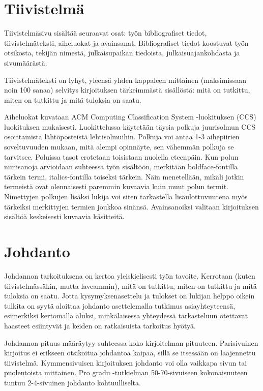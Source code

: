 \section{Tiivistelmä}



Tiivistelmäsivu sisältää seuraavat osat: työn bibliografiset tiedot,
tiivistelmäteksti, aiheluokat ja avainsanat. Bibliografiset tiedot
koostuvat työn otsikosta, tekijän nimestä, julkaisupaikan tiedoista,
julkaisuajankohdasta ja sivumäärästä.

Tiivistelmäteksti on lyhyt, yleensä yhden kappaleen mittainen
(maksimissaan noin 100 sanaa) selvitys
kirjoituksen tärkeimmästä sisällöstä: mitä on tutkittu, miten on
tutkittu ja mitä tuloksia on saatu.


Aiheluokat kuvataan ACM Computing Classification System -luokituksen (CCS)
luokituksen mukaisesti. Luokittelussa käytetään täysia polkuja juurisolmun CCS osoittamista lähtöposteistä lehtisolmuihin. Polkuja voi antaa 1-3 aihepiirien soveltuvuuden mukaan, mitä alempi opinnäyte, sen vähemmän polkuja se tarvitsee. 
Poluissa tasot erotetaan toisistaan nuolella eteenpäin. Kun  polun nimisanoja arvioidaan suhteessa työn sisältöön, merkitään boldface-fontilla tärkein termi, italics-fontilla toiseksi tärkein. Näin menetellään, mikäli jotkin termeistä ovat olennaisesti paremmin kuvaavia kuin muut polun termit. Nimettyjen polkujen lisäksi lukija voi siten tarkastella lisäulottuvuutena myös tärkeiksi merkittyjen termien joukkoa sinänsä.
Avainsanoiksi valitaan kirjoituksen sisältöä
keskeisesti kuvaavia käsitteitä.

\section{Johdanto}


Johdannon tarkoituksena on kertoa yleiskielisesti
työn tavoite. Kerrotaan (kuten tiivistelmässäkin, mutta laveammin),
mitä on tutkittu, miten on tutkittu ja mitä tuloksia on saatu.
Jotta kysymyksenasettelu ja tulokset on lukijan helppo oikein tulkita on syytä aloittaa johdanto asettelemalla tutkimus asiayhteyteensä, esimerkiksi kertomalla aluksi, minkälaisessa yhteydessä tarkasteluun otettavat haasteet esiintyvät ja keiden on ratkaisuista tarkoitus hyötyä.

Johdannon pituus määräytyy suhteessa koko kirjoitelman pituuteen.
Parisivuinen kirjoitus ei erikseen otsikoitua johdantoa kaipaa, sillä
se itsessään on laajennettu tiivistelmä. Kymmensivuisen
kirjoituksen johdanto voi olla vaikkapa sivun tai puolentoista
mittainen. Pro gradu -tutkielman 50-70-sivuiseen kokonaisuuteen
tuntuu 2-4-sivuinen johdanto kohtuulliselta. 

